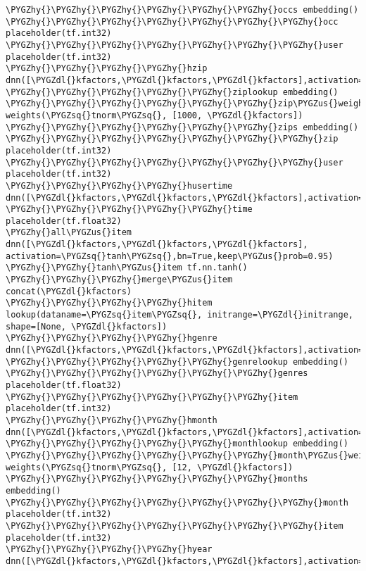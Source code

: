 \documentclass[letterpaper,10pt,english]{sphinxmanual}
\def\PYGZus{\char`\_}
\def\PYGZdl{\char`\$}
\def\PYGZhy{\char`\-}
\def\PYGZsq{\char`\'}
\renewcommand\PYGZsq{\textquotesingle}
\begin{document}
\begin{Verbatim}[commandchars=\\\{\}]
\PYGZhy{}\PYGZhy{}\PYGZhy{}\PYGZhy{}\PYGZhy{}\PYGZhy{}occs embedding()
\PYGZhy{}\PYGZhy{}\PYGZhy{}\PYGZhy{}\PYGZhy{}\PYGZhy{}\PYGZhy{}occ placeholder(tf.int32)
\PYGZhy{}\PYGZhy{}\PYGZhy{}\PYGZhy{}\PYGZhy{}\PYGZhy{}\PYGZhy{}user placeholder(tf.int32)
\PYGZhy{}\PYGZhy{}\PYGZhy{}\PYGZhy{}hzip dnn([\PYGZdl{}kfactors,\PYGZdl{}kfactors,\PYGZdl{}kfactors],activation=\PYGZsq{}tanh\PYGZsq{},bn=True,keep\PYGZus{}prob=0.95)
\PYGZhy{}\PYGZhy{}\PYGZhy{}\PYGZhy{}\PYGZhy{}ziplookup embedding()
\PYGZhy{}\PYGZhy{}\PYGZhy{}\PYGZhy{}\PYGZhy{}\PYGZhy{}zip\PYGZus{}weights weights(\PYGZsq{}tnorm\PYGZsq{}, [1000, \PYGZdl{}kfactors])
\PYGZhy{}\PYGZhy{}\PYGZhy{}\PYGZhy{}\PYGZhy{}\PYGZhy{}zips embedding()
\PYGZhy{}\PYGZhy{}\PYGZhy{}\PYGZhy{}\PYGZhy{}\PYGZhy{}\PYGZhy{}zip placeholder(tf.int32)
\PYGZhy{}\PYGZhy{}\PYGZhy{}\PYGZhy{}\PYGZhy{}\PYGZhy{}\PYGZhy{}user placeholder(tf.int32)
\PYGZhy{}\PYGZhy{}\PYGZhy{}\PYGZhy{}husertime dnn([\PYGZdl{}kfactors,\PYGZdl{}kfactors,\PYGZdl{}kfactors],activation=\PYGZsq{}tanh\PYGZsq{},bn=True,keep\PYGZus{}prob=0.95)
\PYGZhy{}\PYGZhy{}\PYGZhy{}\PYGZhy{}\PYGZhy{}time placeholder(tf.float32)
\PYGZhy{}all\PYGZus{}item dnn([\PYGZdl{}kfactors,\PYGZdl{}kfactors,\PYGZdl{}kfactors], activation=\PYGZsq{}tanh\PYGZsq{},bn=True,keep\PYGZus{}prob=0.95)
\PYGZhy{}\PYGZhy{}tanh\PYGZus{}item tf.nn.tanh()
\PYGZhy{}\PYGZhy{}\PYGZhy{}merge\PYGZus{}item concat(\PYGZdl{}kfactors)
\PYGZhy{}\PYGZhy{}\PYGZhy{}\PYGZhy{}hitem lookup(dataname=\PYGZsq{}item\PYGZsq{}, initrange=\PYGZdl{}initrange, shape=[None, \PYGZdl{}kfactors])
\PYGZhy{}\PYGZhy{}\PYGZhy{}\PYGZhy{}hgenre dnn([\PYGZdl{}kfactors,\PYGZdl{}kfactors,\PYGZdl{}kfactors],activation=\PYGZsq{}tanh\PYGZsq{},bn=True,keep\PYGZus{}prob=0.95)
\PYGZhy{}\PYGZhy{}\PYGZhy{}\PYGZhy{}\PYGZhy{}genrelookup embedding()
\PYGZhy{}\PYGZhy{}\PYGZhy{}\PYGZhy{}\PYGZhy{}\PYGZhy{}genres placeholder(tf.float32)
\PYGZhy{}\PYGZhy{}\PYGZhy{}\PYGZhy{}\PYGZhy{}\PYGZhy{}item placeholder(tf.int32)
\PYGZhy{}\PYGZhy{}\PYGZhy{}\PYGZhy{}hmonth dnn([\PYGZdl{}kfactors,\PYGZdl{}kfactors,\PYGZdl{}kfactors],activation=\PYGZsq{}tanh\PYGZsq{},bn=True,keep\PYGZus{}prob=0.95)
\PYGZhy{}\PYGZhy{}\PYGZhy{}\PYGZhy{}\PYGZhy{}monthlookup embedding()
\PYGZhy{}\PYGZhy{}\PYGZhy{}\PYGZhy{}\PYGZhy{}\PYGZhy{}month\PYGZus{}weights weights(\PYGZsq{}tnorm\PYGZsq{}, [12, \PYGZdl{}kfactors])
\PYGZhy{}\PYGZhy{}\PYGZhy{}\PYGZhy{}\PYGZhy{}\PYGZhy{}months embedding()
\PYGZhy{}\PYGZhy{}\PYGZhy{}\PYGZhy{}\PYGZhy{}\PYGZhy{}\PYGZhy{}month placeholder(tf.int32)
\PYGZhy{}\PYGZhy{}\PYGZhy{}\PYGZhy{}\PYGZhy{}\PYGZhy{}\PYGZhy{}item placeholder(tf.int32)
\PYGZhy{}\PYGZhy{}\PYGZhy{}\PYGZhy{}hyear dnn([\PYGZdl{}kfactors,\PYGZdl{}kfactors,\PYGZdl{}kfactors],activation=\PYGZsq{}tanh\PYGZsq{},bn=True,keep\PYGZus{}prob=0.95)

\end{Verbatim}
\end{document}
